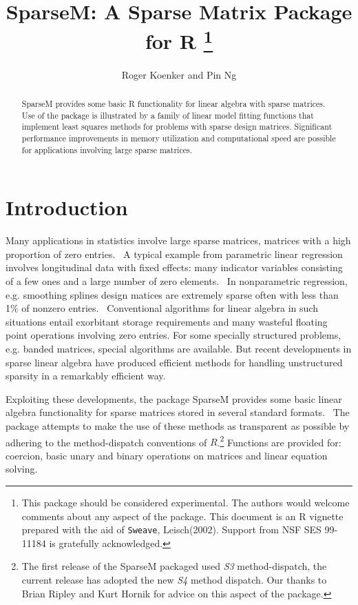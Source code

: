 \documentclass{article}
\title{SparseM:  A Sparse Matrix Package for R
\thanks{This package should be considered experimental.  The
authors would welcome comments about any aspect of the package.
This document is an R vignette prepared with the aid of \texttt{Sweave},
Leisch(2002).  Support from NSF SES 99-11184 is gratefully acknowledged.}}
\author{Roger Koenker and Pin Ng}
\begin{document}
\maketitle
\begin{abstract}
SparseM provides some basic R functionality for linear algebra with sparse matrices.
Use of the package is illustrated by a family of linear model fitting functions that
implement least squares methods for problems with sparse design matrices.  
Significant performance improvements in memory utilization and computational 
speed are possible for applications involving large sparse matrices.
\end{abstract}
\section{Introduction}

Many applications in statistics involve large sparse matrices, matrices
with a high proportion of zero entries. \ A typical example from parametric
linear regression involves longitudinal data with fixed effects:  many indicator
variables consisting of a few ones and a large number of zero elements. \ In nonparametric
regression, e.g. smoothing splines  design matices are extremely sparse often with
less than 1\% of nonzero entries. \ Conventional algorithms for linear algebra
in such situations entail exorbitant storage requirements and many wasteful
floating point operations involving zero entries.
For some specially structured problems, e.g. banded matrices,
special algorithms are available.  But recent developments in sparse linear algebra 
have produced efficient methods for handling unstructured sparsity in a remarkably
efficient way.

Exploiting these developments, the package  SparseM provides some basic
linear algebra functionality for sparse matrices stored in several standard 
formats. \ The package attempts to make the use of these methods as transparent
as possible by adhering to the method-dispatch conventions of $R$.\footnote{
The first release of the SparseM packaged used {\it S3} method-dispatch,
the current release has adopted the new {\it S4} method dispatch.
Our thanks to Brian Ripley and Kurt Hornik for advice on this aspect of the package.}
Functions are provided for:  coercion, basic unary and binary operations on matrices
and linear equation solving.
\end{document}
